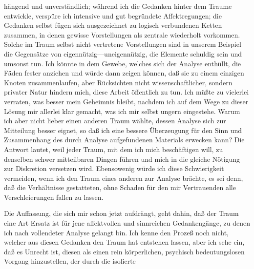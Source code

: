 \documentclass[twoside=true,titlepage=false,open=any, parskip=never, fontsize=10pt, headings=small, chapterprefix=false, appendixprefix=false]{scrbook}
\begin{document}
         
            
            
            
        \pstart
        hängend und unverständlich; während ich die Gedanken hinter dem
               Traume entwickle, verspüre ich intensive und gut begründete Affektregungen; die
               Gedanken selbst fügen sich ausgezeichnet zu logisch verbundenen
               Ketten zusammen, in denen gewisse Vorstellungen als zentrale wiederholt
               vorkommen. Solche im Traum selbst nicht vertretene Vorstellungen sind in
               unserem Beispiel die Gegensätze von eigennützig—uneigennützig, die Elemente
                  schuldig sein und umsonst tun. Ich könnte in dem Gewebe, welches sich der Analyse
               enthüllt, die Fäden fester anziehen und würde dann zeigen können, daß sie zu
               einem einzigen Knoten zusammenlaufen, aber Rücksichten nicht wissenschaftlicher, sondern privater Natur hindern mich, diese Arbeit
               öffentlich zu tun. Ich müßte zu vielerlei verraten, was besser mein Geheimnis
               bleibt, nachdem ich auf dem Wege zu dieser Lösung mir allerlei klar gemacht, was
               ich mir selbst ungern eingestehe. Warum ich aber nicht lieber einen
               anderen Traum wählte, dessen Analyse sich zur Mitteilung besser eignet, so
               daß ich eine bessere Überzeugung für den Sinn und Zusammenhang des durch
               Analyse aufgefundenen Materials erwecken kann? Die Antwort lautet, weil jeder Traum, mit dem ich mich beschäftigen will,
               zu denselben schwer mitteilbaren Dingen führen und mich in die gleiche Nötigung
               zur Diskretion versetzen wird. Ebensowenig würde ich diese
               Schwierigkeit vermeiden, wenn ich den Traum eines anderen zur Analyse brächte,
               es sei denn, daß die Verhältnisse gestatteten, ohne Schaden für den mir
               Vertrauenden alle Verschleierungen fallen zu lassen.
        \pend
    
            
        \pstart
        Die Auffassung, die sich mir schon jetzt aufdrängt, geht dahin, daß der Traum
               eine Art Ersatz ist für jene affektvollen und
               sinnreichen Gedankengänge, zu denen ich nach vollendeter Analyse gelangt bin.
               Ich kenne den Prozeß noch nicht, welcher aus diesen Gedanken den Traum hat
               entstehen lassen, aber ich sehe ein, daß es Unrecht ist, diesen als einen rein
               körperlichen, psychisch bedeutungslosen Vorgang hinzustellen, der durch die
               isolierte
        \pend
    
\end{document}
